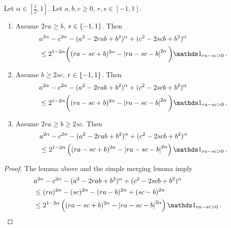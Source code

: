 \begin{lemma}\label{lmm:rascMergingLemma}
	Let $\alpha\in[\frac12,1]$.
	Let $a,b,c\geq0$, $r,s\in[-1,1]$.
	\theoremContentInNewLine
	\begin{enumerate}[label=\environmentEnumerateLabel]
	\item 
		Assume $2ra \geq b$, $s\in\left\lbrace -1,1 \right\rbrace$.
		Then
		\begin{align*}
			&a^{2\alpha}-c^{2\alpha}-(a^2-2rab+b^2)^{\alpha} + (c^2 - 2 s c b + b^2)^\alpha
			\\& \leq 2^{1-2\alpha} \bigg((ra - s c + b)^{2\alpha}-\abs{ra - s c - b}^{2\alpha}\bigg) \ind_{ra-sc>0}
			\eqfs
		\end{align*}	
	\item 
		Assume $b \geq 2sc$, $r\in\left\lbrace -1,1 \right\rbrace$.
		Then
		\begin{align*}
			&a^{2\alpha}-c^{2\alpha}-(a^2-2rab+b^2)^{\alpha} + (c^2 - 2 s c b + b^2)^\alpha 
			\\&\leq 2^{1-2\alpha} \bigg((ra - s c + b)^{2\alpha}-\abs{ra - s c - b}^{2\alpha}\bigg)\ind_{ra-sc>0}
			\eqfs
		\end{align*}	
	\item 
		Assume $2ra \geq b \geq 2sc$.
		Then
		\begin{align*}
			&a^{2\alpha}-c^{2\alpha}-(a^2-2rab+b^2)^{\alpha} + (c^2 - 2 s c b + b^2)^\alpha 
			\\&\leq 2^{1-2\alpha} \br{(ra - s c + b)^{2\alpha}-\abs{ra - s c - b}^{2\alpha}}\ind_{ra-sc>0}
			\eqfs
		\end{align*}	
	\end{enumerate}
\end{lemma}
%
\begin{proof}
	The lemma above and the simple merging lemma imply
	\begin{align*} 
		&a^{2\alpha}-c^{2\alpha}-(a^2-2rab+b^2)^{\alpha} + (c^2 - 2 s c b + b^2)^\alpha 
		\\&\leq 
		(ra)^{2\alpha}-(sc)^{2\alpha}-(ra-b)^{2\alpha} + (sc-b)^{2\alpha}
		\\&\leq 
		2^{1-2\alpha} \br{(ra - s c + b)^{2\alpha}-\abs{ra - s c - b}^{2\alpha}}\ind_{ra-sc>0}
		\eqfs
	\end{align*}	
\end{proof}
%
